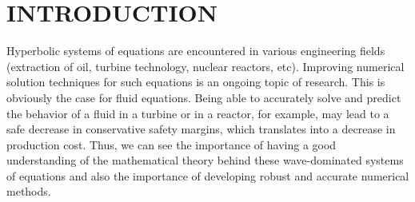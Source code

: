 %
%
%


\pagestyle{plain} %
\setcounter{page}{1}

\chapter{\uppercase {Introduction}}
Hyperbolic systems of equations are encountered in various engineering fields (extraction of oil, turbine technology, nuclear reactors, etc). Improving numerical solution techniques for such equations is an ongoing topic of research. This is obviously the case for fluid equations. Being able to accurately solve and predict the behavior of a fluid in a turbine or in a reactor, for example, may lead to a safe decrease in conservative safety margins, which translates into a decrease in production cost. Thus, we can see the importance of having a good understanding of the mathematical theory behind these wave-dominated systems of equations and also the importance of developing robust and accurate numerical methods.


